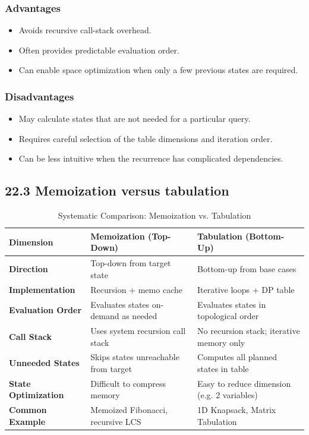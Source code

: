 \subsubsection{Advantages}

\begin{itemize}
    \item Avoids recursive call-stack overhead.
    \item Often provides predictable evaluation order.
    \item Can enable space optimization when only a few previous states are required.
\end{itemize}

\subsubsection{Disadvantages}

\begin{itemize}
    \item May calculate states that are not needed for a particular query.
    \item Requires careful selection of the table dimensions and iteration order.
    \item Can be less intuitive when the recurrence has complicated dependencies.
\end{itemize}

\subsection{22.3 Memoization versus tabulation}

\begin{table}[htbp]
\centering
\caption{Systematic Comparison: Memoization vs. Tabulation}
\label{tab:memoization_vs_tabulation}
\begin{tabularx}{\textwidth}{p{3.2cm} X X}
\toprule
\textbf{Dimension} & \textbf{Memoization (Top-Down)} & \textbf{Tabulation (Bottom-Up)} \\
\midrule
\textbf{Direction} & Top-down from target state & Bottom-up from base cases \\
\textbf{Implementation} & Recursion + memo cache & Iterative loops + DP table \\
\textbf{Evaluation Order} & Evaluates states on-demand as needed & Evaluates states in topological order \\
\textbf{Call Stack} & Uses system recursion call stack & No recursion stack; iterative memory only \\
\textbf{Unneeded States} & Skips states unreachable from target & Computes all planned states in table \\
\textbf{State Optimization} & Difficult to compress memory & Easy to reduce dimension (e.g. 2 variables) \\
\textbf{Common Example} & Memoized Fibonacci, recursive LCS & 1D Knapsack, Matrix Tabulation \\
\bottomrule
\end{tabularx}
\end{table}

